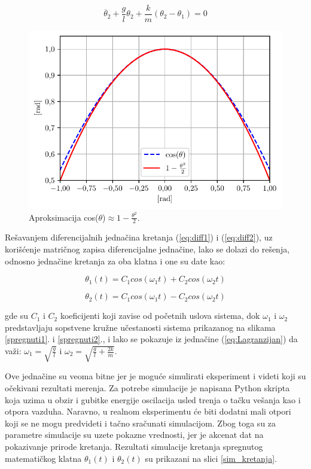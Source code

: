 \documentclass[a4paper, 12pt, diplomski]{etf}
\begin{document}
\begin{equation}
\ddot{\theta_2} + \frac{g}{l} \theta_2 + \frac{k}{m}(\theta_2 - \theta_1) = 0
\label{eq:diff2}
\end{equation}


\begin{figure}[h!]
    \centering
    \includegraphics[scale=1]{py_teorija/cos_approx.pdf}
    \caption{Aproksimacija cos($\theta$)$\approx 1-\frac{\theta^2}{2}$.}
    \label{cos_approx}
\end{figure}

Rešavanjem diferencijalnih jednačina kretanja (\ref{eq:diff1}) i (\ref{eq:diff2}), uz korišćenje matričnog zapisa diferencijalne jednačine, lako se dolazi do rešenja, odnosno jednačine kretanja za oba klatna i one su date kao:

\begin{equation}
\theta_1(t) = C_1cos(\omega_1t) + C_2cos(\omega_2t)
\end{equation}

\begin{equation}
\theta_2(t) = C_1cos(\omega_1t) - C_2cos(\omega_2t)
\end{equation}

\noindent
gde su $C_1$ i $C_2$ koeficijenti koji zavise od početnih uslova sistema, dok $\omega_1$ i $\omega_2$ predstavljaju sopstvene kružne učestanosti sistema prikazanog na slikama \ref{spregnuti1}. i \ref{spregnuti2}., i lako se pokazuje iz jednačine (\ref{eq:Lagranzijan}) da važi: $\omega_1 = \sqrt{\frac{g}{l}}$ i $\omega_2 = \sqrt{\frac{g}{l} + \frac{2k}{m}}$.

Ove jednačine su veoma bitne jer je moguće simulirati eksperiment i videti koji su očekivani rezultati merenja. Za potrebe simulacije je napisana Python skripta koja uzima u obzir i gubitke energije oscilacija usled trenja o tačku vešanja kao i otpora vazduha. Naravno, u realnom eksperimentu će biti dodatni mali otpori koji se ne mogu predvideti i tačno sračunati simulacijom. Zbog toga su za parametre simulacije su uzete pokazne vrednosti, jer je akcenat dat na pokazivanje prirode kretanja. Rezultati simulacije kretanja spregnutog matematičkog klatna $\theta_1(t)$ i $\theta_2(t)$ su prikazani na slici \ref{sim_kretanja}.
\end{document}
